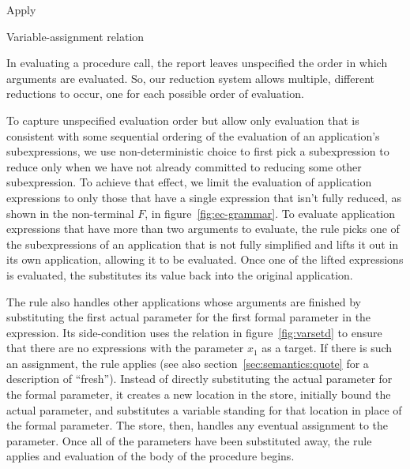 \beginfig
\subfigureadjust{}
\begin{center}


\end{center}
\caption{Apply}\label{fig:Apply}
\endfig

\beginfig
\subfigureadjust{}
\begin{center}

\end{center}
\caption{Variable-assignment relation}\label{fig:varsetd}
\endfig
\subfigurestop{}

In evaluating a procedure call, the report leaves
unspecified the order in which arguments are evaluated. So, our reduction system allows multiple, different reductions to occur, one for each possible order of evaluation.

To capture unspecified evaluation order but allow only evaluation that
is consistent with some sequential ordering of the evaluation of an
application's subexpressions, we use non-deterministic choice to first pick
a subexpression to reduce only when we have not already committed to
reducing some other subexpression. To achieve that effect, we limit
the evaluation of application expressions to only those that have a
single expression that isn't fully reduced, as shown in the
non-terminal $F$, in figure~\ref{fig:ec-grammar}. To evaluate
application expressions that have more than two arguments to evaluate,
the rule  picks one of the subexpressions of an
application that is not fully simplified and lifts it out in its own
application, allowing it to be evaluated. Once one of the lifted
expressions is evaluated, the  substitutes its value
back into the original application.

The  rule also handles other applications whose
arguments are finished by substituting the first actual parameter for
the first formal parameter in the expression. Its side-condition uses
the relation in figure~\ref{fig:varsetd} to ensure that there are no
 expressions with the parameter $x_1$ as a target.
If there is such an assignment, the  rule applies (see also section~\ref{sec:semantics:quote} for a description of ``fresh'').
Instead of directly substituting the actual parameter for the formal
parameter, it creates a new location in the store, initially bound the
actual parameter, and substitutes a variable standing for that
location in place of the formal parameter. The store, then, handles
any eventual assignment to the parameter. Once all of the parameters
have been substituted away, the rule  applies and
evaluation of the body of the procedure begins.

